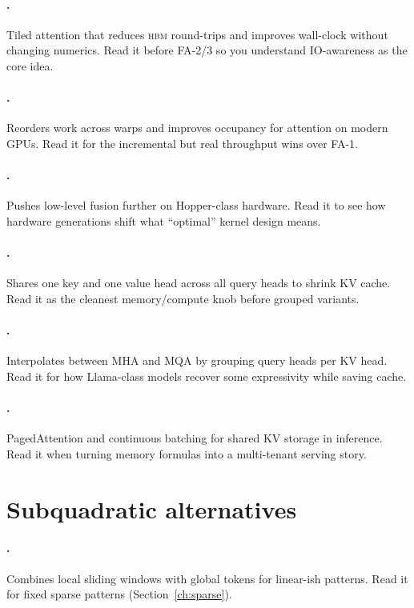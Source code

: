 \paragraph{\citet{dao2022flashattention}.}
Tiled attention that reduces \textsc{hbm} round-trips and improves wall-clock
without changing numerics. Read it before FA-2/3 so you understand IO-awareness
as the core idea.

\paragraph{\citet{dao2023fa2}.}
Reorders work across warps and improves occupancy for attention on modern GPUs.
Read it for the incremental but real throughput wins over FA-1.

\paragraph{\citet{shah2024fa3}.}
Pushes low-level fusion further on Hopper-class hardware. Read it to see how
hardware generations shift what ``optimal'' kernel design means.

\paragraph{\citet{shazeer2019mqa}.}
Shares one key and one value head across all query heads to shrink KV cache.
Read it as the cleanest memory/compute knob before grouped variants.

\paragraph{\citet{ainslie2023gqa}.}
Interpolates between MHA and MQA by grouping query heads per KV head. Read it
for how Llama-class models recover some expressivity while saving cache.

\paragraph{\citet{kwon2023vllm}.}
PagedAttention and continuous batching for shared KV storage in inference.
Read it when turning memory formulas into a multi-tenant serving story.

\section*{Subquadratic alternatives}

\paragraph{\citet{beltagy2020longformer}.}
Combines local sliding windows with global tokens for linear-ish patterns.
Read it for fixed sparse patterns (Section~\ref{ch:sparse}).

